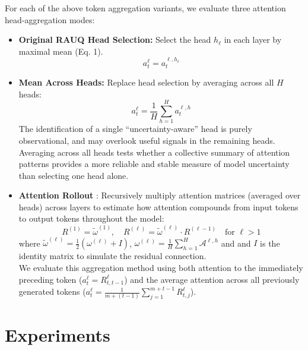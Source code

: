\documentclass[letterpaper]{article} %
\begin{document}
For each of the above token aggregation variants, we evaluate three attention head‐aggregation modes:

\begin{itemize}
  \item \textbf{Original RAUQ Head Selection:}  
    Select the head \(h_\ell\) in each layer by maximal mean (Eq. 1).
    {\footnotesize
    \begin{equation}
         a^\ell_t = a^{\ell, h_\ell}_t
    \end{equation}}
    
    
  \item \textbf{Mean Across Heads:}  
    Replace head selection by averaging across all \(H\) heads:
    {\footnotesize
    \begin{equation}
        a_t^{\ell} = \frac{1}{H}\sum_{h=1}^{H} a_t^{\ell,h}
    \end{equation}}
  The identification of a single “uncertainty‑aware” head is purely observational, and may overlook useful signals in the remaining heads. Averaging across all heads tests whether a collective summary of attention patterns provides a more reliable and stable measure of model uncertainty than selecting one head alone.


    \item \textbf{Attention Rollout} \cite{abnar-zuidema-2020-quantifying}: Recursively multiply attention matrices (averaged over heads) across layers to estimate how attention compounds from input tokens to output tokens throughout the model:
    {\footnotesize
    \begin{equation} 
        R^{(1)} = \tilde{\omega}^{(1)}, \quad
        R^{(\ell)} = \tilde{\omega}^{(\ell)} \cdot R^{(\ell - 1)} \quad \text{for } \ell > 1
    \end{equation}}
    where $\tilde{\omega}^{(\ell)} = \frac{1}{2}\left( \omega^{(\ell)} + I \right)$, $\omega^{(\ell)} = \frac{1}{H}\sum_{h=1}^{H} \mathcal{A}^{\ell,h}$ and and \(I\) is the identity matrix to simulate the residual connection.\\ We evaluate this aggregation method using both attention to the immediately preceding token ($a^\ell_t = R^\ell_{t, t-1}$) and the average attention across all previously generated tokens ($a_t^{\ell} = \frac{1}{m + (t-1)} \sum_{j=1}^{m+t-1} R^{\ell}_{t,j}$).\\

\end{itemize}

\section{Experiments}
\end{document}
